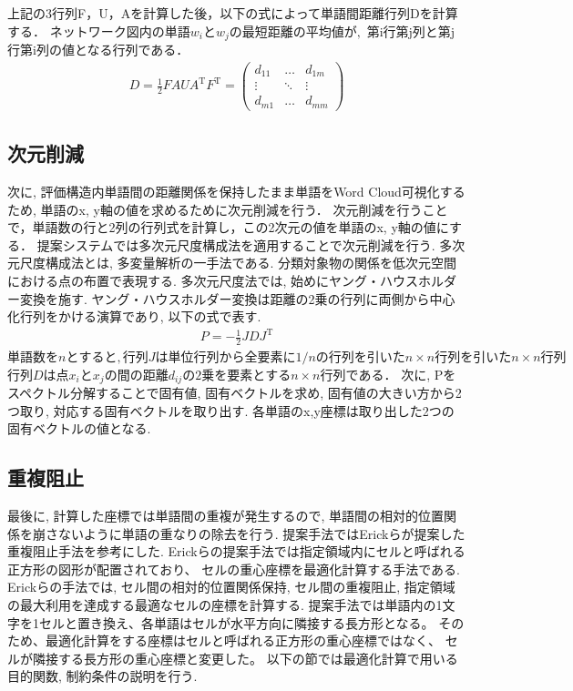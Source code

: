 \documentclass[syuuron]{kuee}
\begin{document}
				
				
			上記の3行列F，U，Aを計算した後，以下の式によって単語間距離行列Dを計算する．
			$ネットワーク図内の単語w_iとw_jの最短距離の平均値が, $
			第i行第j列と第j行第i列の値となる行列である．
			\begin{eqnarray}
			 D = \frac{1}{2} FAUA^{\mathrm{T}}F^{\mathrm{T}}
			   = \left(
			    \begin{array}{cccc}
			    	d_{11} & \ldots & d_{1m} \\
			    	\vdots & \ddots & \vdots \\
			    	d_{m1} & \ldots & d_{mm}
				\end{array}
			 \right)
			\end{eqnarray}	
			
		\subsection{次元削減}
			次に, 評価構造内単語間の距離関係を保持したまま単語をWord Cloud可視化するため, 単語のx, y軸の値を求めるために次元削減を行う．
			次元削減を行うことで，単語数の行と2列の行列式を計算し，この2次元の値を単語のx, y軸の値にする．
			提案システムでは多次元尺度構成法を適用することで次元削減を行う. 
			多次元尺度構成法とは, 多変量解析の一手法である.  分類対象物の関係を低次元空間における点の布置で表現する. 
			多次元尺度法では, 始めにヤング・ハウスホルダー変換を施す. 
			ヤング・ハウスホルダー変換は距離の2乗の行列に両側から中心化行列をかける演算であり, 以下の式で表す. 
			\begin{eqnarray}
				P = - \frac{1}{2} JDJ^{\mathrm{T}}
			\end{eqnarray}
			$単語数をnとすると, 行列Jは単位行列から全要素に1/nの行列を引いたn \times n行列を引いたn \times n行列$
			$行列Dは点 x_i と x_j の間の距離 d_{ij} の2乗を要素とするn×n行列である．$
			次に, Pをスペクトル分解することで固有値, 固有ベクトルを求め, 固有値の大きい方から2つ取り, 対応する固有ベクトルを取り出す. 
			各単語のx,y座標は取り出した2つの固有ベクトルの値となる. 
			
		\subsection{重複阻止}
			最後に, 計算した座標では単語間の重複が発生するので, 単語間の相対的位置関係を崩さないように単語の重なりの除去を行う. 
			提案手法ではErickらが提案した重複阻止手法を参考にした\cite{or2}. 
			Erickらの提案手法では指定領域内にセルと呼ばれる正方形の図形が配置されており、
			セルの重心座標を最適化計算する手法である. 
			Erickらの手法では, セル間の相対的位置関係保持, セル間の重複阻止, 指定領域の最大利用を達成する最適なセルの座標を計算する. 
			提案手法では単語内の1文字を1セルと置き換え、各単語はセルが水平方向に隣接する長方形となる。
			そのため、最適化計算をする座標はセルと呼ばれる正方形の重心座標ではなく、
			セルが隣接する長方形の重心座標と変更した。
			以下の節では最適化計算で用いる目的関数, 制約条件の説明を行う. 
			
\end{document}
